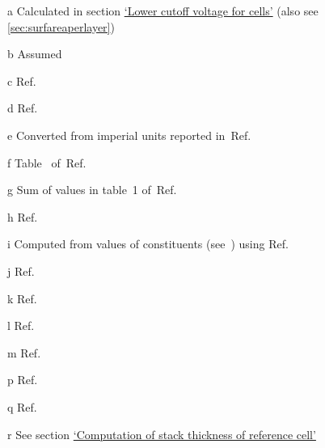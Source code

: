 \begin{table}[!htbp]
\begin{threeparttable}
        \smallskip
        \vspace*{-5pt}
        \begin{tablenotes}
            \begin{footnotesize}
            \item[a] Calculated in section \hyperlink{celllowercutoff}{`Lower cutoff voltage for cells'} (also see \cref{sec:surfareaperlayer})
            \item[b] Assumed
            \item[c] Ref.~\cite{Sae2010}
            \item[d] Ref.~\cite{Kizilel2009}
            \item[e] Converted from imperial units reported in~Ref.~\cite{GMBoltBatteryDims}
		    \item[f] Table~ of~Ref.~\cite{Groger2015} \\
            \item[g] Sum of values in table~1 of~Ref.~\cite{Svens2013}
            \item[h] Ref.~\cite{Chen2005} \\
            \item[i] Computed from values of constituents (see~\cite{Svens2013}) using Ref.~\cite{martienssen2006springer} \\
            \item[j] Ref.~\cite{Guo2010}
            \item[k] Ref.~\cite{Jeon2011}
            \item[l] Ref.~\cite{Worwood2017,Song2000}
            \item[m] Ref.~\cite{Kim2009}
            \item[p] Ref.~\cite{Northrop2011}
            \item[q] Ref.~\cite{Subramanian2009} \\
            \item[r] See section \hyperlink{stackthickness}{`Computation of stack thickness of reference cell'}
            \end{footnotesize}
        \end{tablenotes}
    \end{threeparttable}
\end{table}

